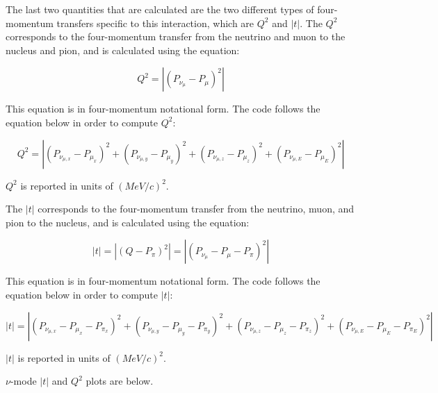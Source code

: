\documentclass[11pt]{article}
\begin{document}
The last two quantities that are calculated are the two different types of four-momentum transfers specific to this interaction, which are $Q^2$ and $|t|$. The $Q^2$ corresponds to the four-momentum transfer from the neutrino and muon to the nucleus and pion, and is calculated using the equation:

\begin{equation}
Q^2 = |(P_{\nu_\mu} - P_\mu)^2|
\end{equation}

\noindent
This equation is in four-momentum notational form. The code follows the equation below in order to compute $Q^2$:

\begin{equation}
Q^2 = |(P_{\nu_{\mu,x}} - P_{\mu_x})^2 + (P_{\nu_{\mu,y}} - P_{\mu_y})^2 + (P_{\nu_{\mu,z}} - P_{\mu_z})^2 + (P_{\nu_{\mu,E}} - P_{\mu_E})^2|
\end{equation}

\noindent
$Q^2$ is reported in units of $(MeV/c)^2$.

The $|t|$ corresponds to the four-momentum transfer from the neutrino, muon, and pion to the nucleus, and is calculated using the equation:

\begin{equation}
|t| = |(Q - P_\pi)^2| = |(P_{\nu_\mu} - P_\mu - P_\pi)^2|
\end{equation}

\noindent
This equation is in four-momentum notational form. The code follows the equation below in order to compute $|t|$:

\begin{equation}
|t| = |(P_{\nu_{\mu,x}} - P_{\mu_x} - P_{\pi_x})^2 + (P_{\nu_{\mu,y}} - P_{\mu_y} - P_{\pi_y})^2 + (P_{\nu_{\mu,z}} - P_{\mu_z} - P_{\pi_z})^2 + (P_{\nu_{\mu,E}} - P_{\mu_E} - P_{\pi_E})^2|
\end{equation}

\noindent
$|t|$ is reported in units of $(MeV/c)^2$.


$\nu$-mode $|t|$ and $Q^2$ plots are below.
\end{document}

